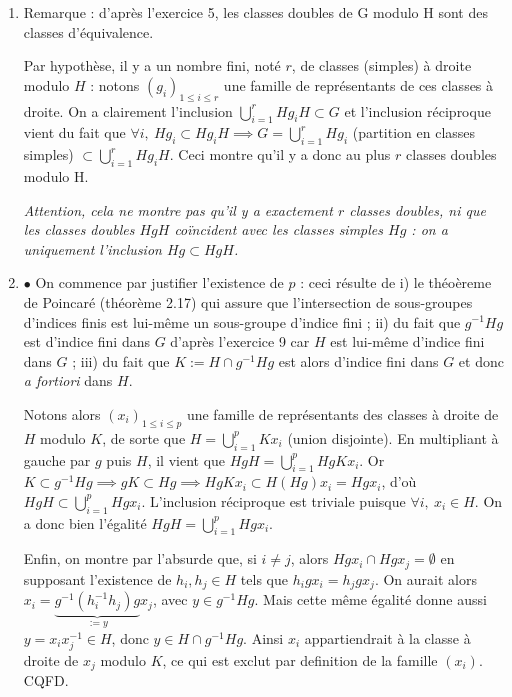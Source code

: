 \begin{enumerate}
 \item Remarque : d'après l'exercice 5, les classes doubles de G modulo H sont des classes d'équivalence.

 Par hypothèse, il y a un nombre fini, noté $r$, de classes (simples) à droite modulo $H$ : notons $(g_i)_{1\leqslant i \leqslant r}$ une famille de représentants de ces classes à droite. On a clairement l'inclusion $\bigcup_{i=1}^r Hg_iH \subset G$ et l'inclusion réciproque vient du fait que $\forall i,~ Hg_i \subset Hg_iH \implies G = \bigcup_{i=1}^r Hg_i$ (partition en classes simples) $\subset \bigcup_{i=1}^r Hg_iH$.
 Ceci montre qu'il y a donc au plus $r$ classes doubles modulo H.

 \emph{Attention, cela ne montre pas qu'il y a exactement $r$ classes doubles, ni que les classes doubles $HgH$ coïncident avec les classes simples $Hg$ : on a uniquement l'inclusion $Hg \subset HgH$. }

 \item $\bullet$ On commence par justifier l'existence de $p$ : ceci résulte de i) le théoèreme de Poincaré (théorème 2.17) qui assure que l'intersection de sous-groupes d'indices finis est lui-même un sous-groupe d'indice fini ; ii) du fait que $g^{-1}Hg$ est d'indice fini dans $G$ d'après l'exercice 9 car $H$ est lui-même d'indice fini dans $G$ ; iii) du fait que $K := H \cap g^{-1}Hg$ est alors d'indice fini dans $G$ et donc \textit{a fortiori} dans $H$.
 
 Notons alors $(x_i)_{1\leqslant i \leqslant p}$ une famille de représentants des classes à droite de $H$ modulo $K$, de sorte que $H = \bigcup_{i=1}^p Kx_i$ (union disjointe). En multipliant à gauche par $g$ puis $H$, il vient que $HgH =  \bigcup_{i=1}^p HgKx_i$. Or $K\subset g^{-1}Hg \implies gK \subset Hg \implies HgKx_i \subset H(Hg)x_i = Hgx_i$, d'où $HgH \subset  \bigcup_{i=1}^p Hgx_i$. L'inclusion réciproque est triviale puisque $\forall i,~ x_i \in H$. On a donc bien l'égalité $HgH =  \bigcup_{i=1}^p Hgx_i$.
 
 Enfin, on montre par l'absurde que, si $i\neq j$, alors $Hgx_i \cap Hgx_j = \emptyset$ en supposant l'existence de $h_i, h_j \in H$ tels que $h_igx_i = h_jgx_j$. On aurait alors $x_i = \underbrace{g^{-1}(h_i^{-1}h_j) g}_{:=y} x_j$, avec $y\in  g^{-1}Hg$. Mais cette même égalité donne aussi $y = x_ix_j^{-1} \in H$, donc $y \in H\cap g^{-1}Hg$. Ainsi $x_i$ appartiendrait à la classe à droite de $x_j$ modulo $K$, ce qui est exclut par definition de la famille $(x_i)$. CQFD.
 

\end{enumerate}
